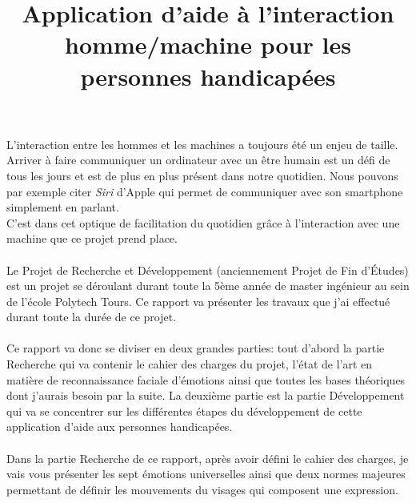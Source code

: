 \documentclass[overfullbox, poster]{polytech/polytech}
\title{Application d'aide à l'interaction homme/machine pour les personnes handicapées}
\begin{document}
\maketitle


L'interaction entre les hommes et les machines a toujours été un enjeu de taille. Arriver à faire communiquer un ordinateur avec un être humain est un défi de tous les jours et est de plus en plus présent dans notre quotidien. Nous pouvons par exemple citer \textit{Siri} d'Apple qui permet de communiquer avec son smartphone simplement en parlant.\\ 
C'est dans cet optique de facilitation du quotidien grâce à l'interaction avec une machine que ce projet prend place.\\
\\
Le Projet de Recherche et Développement (anciennement Projet de Fin d'Études) est un projet se déroulant durant toute la 5ème année de master ingénieur au sein de l'école Polytech Tours. Ce rapport va présenter les travaux que j'ai effectué durant toute la durée de ce projet.\\
\\
Ce rapport va donc se diviser en deux grandes parties: tout d'abord la partie Recherche qui va contenir le cahier des charges du projet, l'état de l'art en matière de reconnaissance faciale d'émotions ainsi que toutes les bases théoriques dont j'aurais besoin par la suite. La deuxième partie est la partie Développement qui va se concentrer sur les différentes étapes du développement de cette application d'aide aux personnes handicapées.\\
\\
Dans la partie Recherche de ce rapport, après avoir défini le cahier des charges, je vais vous présenter les sept émotions universelles ainsi que deux normes majeures permettant de définir les mouvements du visages qui composent une expression.\\
\end{document}
